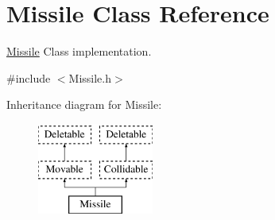 \hypertarget{classMissile}{\section{Missile Class Reference}
\label{classMissile}
}


\hyperlink{classMissile}{Missile} Class implementation.  




{\ttfamily \#include $<$Missile.\-h$>$}

Inheritance diagram for Missile\-:\begin{figure}[H]
\begin{center}
\leavevmode
\includegraphics[height=3.000000cm]{classMissile}
\end{center}
\end{figure}
